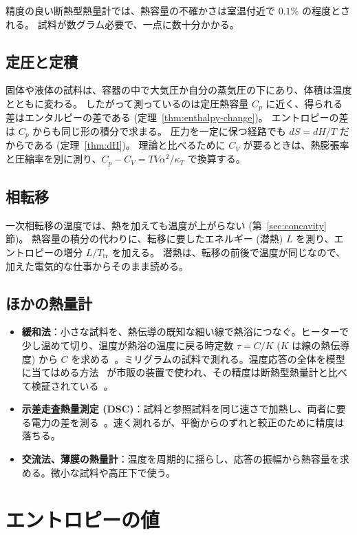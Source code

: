 精度の良い断熱型熱量計では、熱容量の不確かさは室温付近で $0.1\%$ の程度とされる。
試料が数グラム必要で、一点に数十分かかる。

\subsection{定圧と定積}

固体や液体の試料は、容器の中で大気圧か自分の蒸気圧の下にあり、体積は温度とともに変わる。
したがって測っているのは定圧熱容量 $C_p$ に近く、得られる差はエンタルピーの差である (定理~\ref{thm:enthalpy-change})。
エントロピーの差は $C_p$ からも同じ形の積分で求まる。
圧力を一定に保つ経路でも $dS = dH/T$ だからである (定理~\ref{thm:dH})。
理論と比べるために $C_V$ が要るときは、熱膨張率と圧縮率を別に測り、$C_p - C_V = TV\alpha^2/\kappa_T$ で換算する。

\subsection{相転移}

一次相転移の温度では、熱を加えても温度が上がらない (第~\ref{sec:concavity} 節)。
熱容量の積分の代わりに、転移に要したエネルギー (潜熱) $L$ を測り、エントロピーの増分 $L/T_{\mathrm{tr}}$ を加える。
潜熱は、転移の前後で温度が同じなので、加えた電気的な仕事からそのまま読める。

\subsection{ほかの熱量計}

\begin{itemize}
  \item \textbf{緩和法}：小さな試料を、熱伝導の既知な細い線で熱浴につなぐ。ヒーターで少し温めて切り、温度が熱浴の温度に戻る時定数 $\tau = C/K$ ($K$ は線の熱伝導度) から $C$ を求める~\cite{Bachmann1972}。ミリグラムの試料で測れる。温度応答の全体を模型に当てはめる方法~\cite{Hwang1997} が市販の装置で使われ、その精度は断熱型熱量計と比べて検証されている~\cite{Lashley2003}。
  \item \textbf{示差走査熱量測定 (DSC)}：試料と参照試料を同じ速さで加熱し、両者に要る電力の差を測る~\cite{Watson1964}。速く測れるが、平衡からのずれと較正のために精度は落ちる。
  \item \textbf{交流法、薄膜の熱量計}：温度を周期的に揺らし、応答の振幅から熱容量を求める。微小な試料や高圧下で使う。
\end{itemize}

\section{エントロピーの値}

